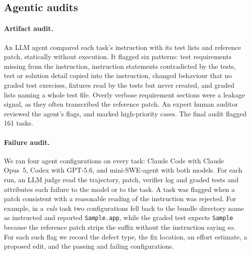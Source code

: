 
%


\subsection{Agentic audits}
\label{sec:audits}

\paragraph{Artifact audit.}
An LLM agent compared each task's instruction with its test lists and reference patch, statically without execution. It flagged six patterns: test requirements missing from the instruction, instruction statements contradicted by the tests, test or solution detail copied into the instruction, changed behaviour that no graded test exercises, fixtures read by the tests but never created, and graded lists naming a whole test file. Overly verbose requirement sections were a leakage signal, as they often transcribed the reference patch. An expert human auditor reviewed the agent's flags, and marked high-priority cases. The final audit flagged 161 tasks. 

\paragraph{Failure audit.}
We ran four agent configurations on every task: Claude Code with Claude Opus~5, Codex with GPT-5.6, and mini-SWE-agent with both models. For each run, an LLM judge read the trajectory, patch, verifier log and graded tests and attributes each failure to the model or to the task. A task was flagged when a patch consistent with a reasonable reading of the instruction was rejected. For example, in a \textit{vuls} task two configurations fell back to the bundle directory name as instructed and reported \texttt{Sample.app}, while the graded test expects \texttt{Sample} because the reference patch strips the suffix without the instruction saying so. For each such flag we record the defect type, the fix location, an effort estimate, a proposed edit, and the passing and failing configurations.


